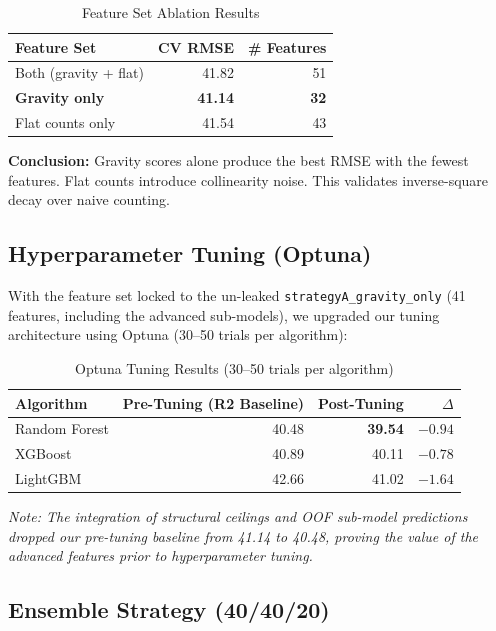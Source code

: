 \documentclass[10.75pt, a4paper]{article}
\begin{document}
\begin{table}[H]
\centering
\caption{Feature Set Ablation Results}
\begin{tabular}{lrr}
\toprule
\textbf{Feature Set} & \textbf{CV RMSE} & \textbf{\# Features} \\
\midrule
Both (gravity + flat) & 41.82 & 51 \\
\textbf{Gravity only} & \textbf{41.14} & \textbf{32} \\
Flat counts only & 41.54 & 43 \\
\bottomrule
\end{tabular}
\end{table}

\textbf{Conclusion:} Gravity scores alone produce the best RMSE with the fewest features. Flat counts introduce collinearity noise. This validates inverse-square decay over naive counting.

\subsection{Hyperparameter Tuning (Optuna)}

With the feature set locked to the un-leaked \texttt{strategyA\_gravity\_only} (41 features, including the advanced sub-models), we upgraded our tuning architecture using Optuna (30--50 trials per algorithm):

\begin{table}[H]
\centering
\caption{Optuna Tuning Results (30--50 trials per algorithm)}
\begin{tabular}{lrrr}
\toprule
\textbf{Algorithm} & \textbf{Pre-Tuning (R2 Baseline)} & \textbf{Post-Tuning} & \textbf{$\Delta$} \\
\midrule
Random Forest & 40.48 & \textbf{39.54} & $-0.94$ \\
XGBoost & 40.89 & 40.11 & $-0.78$ \\
LightGBM & 42.66 & 41.02 & $-1.64$ \\
\bottomrule
\end{tabular}
\end{table}

\textit{Note: The integration of structural ceilings and OOF sub-model predictions dropped our pre-tuning baseline from 41.14 to 40.48, proving the value of the advanced features prior to hyperparameter tuning.}

\subsection{Ensemble Strategy (40/40/20)}
\end{document}

